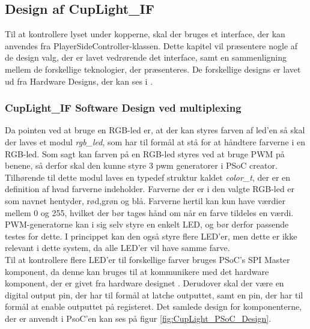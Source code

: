 \documentclass[Softwaredesign/Softwaredesign_main.tex]{subfiles}
\begin{document}
\subsection{Design af CupLight\_IF} \label{sec:cuplight_sw_design}
Til at kontrollere lyset under kopperne, skal der bruges et interface, der kan anvendes fra PlayerSideController-klassen. Dette kapitel vil præsentere nogle af de design valg, der er lavet vedrørende det interface, samt en sammenligning mellem de forskellige teknologier, der præsenteres. De forskellige designs er lavet ud fra Hardware Designs, der kan ses i .
\subsubsection{CupLight\_IF Software Design ved multiplexing}
Da pointen ved at bruge en RGB-led er, at der kan styres farven af led'en så skal der laves  et modul \textit{rgb\_led}, som har til formål at stå for at håndtere farverne i en RGB-led. Som sagt kan farven på en RGB-led styres ved at bruge PWM på benene, så derfor skal den kunne styre 3 pwm generatorer i PSoC creator. Tilhørende til dette modul laves en typedef struktur kaldet \textit{color\_t}, der er en definition af hvad farverne indeholder. Farverne der er i den valgte RGB-led er som navnet hentyder, rød,grøn og blå. Farverne hertil kan kun have værdier mellem 0 og 255, hvilket der bør tages hånd om når en farve tildeles en værdi.
\\ PWM-generatorne kan i sig selv styre en enkelt LED, og bør derfor passende testes for dette. I princippet kan den også styre flere LED'er, men dette er ikke relevant i dette system, da alle LED'er vil have samme farve.
\\Til at kontrollere flere LED'er til forskellige farver bruges PSoC's SPI Master komponent, da denne kan bruges til at kommunikere med det hardware komponent, der er givet fra hardware designet . Derudover skal der være en digital output pin, der har til formål at latche outputtet, samt en pin, der har til formål at enable outputtet på registeret. Det samlede design for komponenterne, der er anvendt i PsoC'en kan ses på figur \ref{fig:CupLight_PSoC_Design}.
\end{document}
